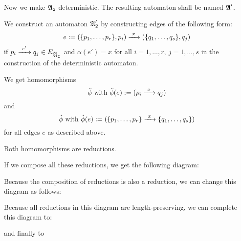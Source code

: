 Now we make $\mbox{$\mathfrak{A}$}_2$ deterministic. The resulting automaton shall be named
$\mbox{$\mathfrak{A}$}'$.

We construct an automaton $\mbox{$\mathfrak{A}$}_2'$ by constructing edges of the following
form:
\[ e := (\{p_1, \ldots, p_r\}, p_i) \xrightarrow{\ {x}\ } (\{q_1, \ldots, q_s\}, q_j) \]
if $p_i \xrightarrow{\ {e'}\ } q_j \in E_{\mbox{$\mathfrak{A_2}$}}$ and $\alpha(e') = x$ for all $i = 1,
\ldots,r,\ j = 1, \ldots, s$ in the construction of the deterministic automaton.

We get homomorphisms
\[ \tilde{\phi} \mbox{ with } \tilde{\phi}(e) := (p_i \xrightarrow{\ {x}\ } q_j) \]
and 
\[ \hat{\phi} \mbox{ with } \hat{\phi}(e) := (\{p_1, \ldots, p_r\} \xrightarrow{\ {x}\ }
\{q_1, \ldots, q_s\}) \]
for all edges $e$ as described above.

Both homomorphisms are reductions.

If we compose all these reductions, we get the following diagram:

\begin{center}
\end{center}

Because the composition of reductions is also a reduction, we can change this
diagram as follows:

\begin{center}
\end{center}

Because all reductions in this diagram are length-preserving, we can complete
this diagram to:

\begin{center}
\end{center}

and finally to

